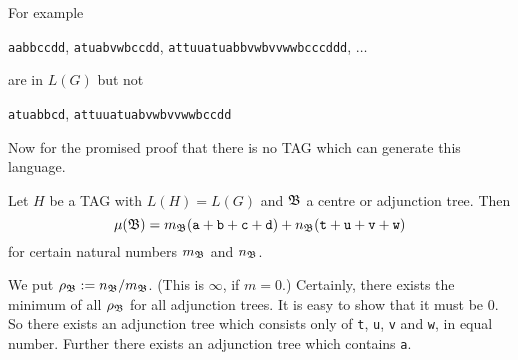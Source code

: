 For example
\begin{center}
{\tt aabbccdd}, {\tt atuabvwbccdd}, {\tt attuuatuabbvwbvvwwbcccddd},
$\dotsc$
\end{center}
are in $L(G)$ but not
\begin{center}
{\tt atuabbcd}, {\tt attuuatuabvwbvvwwbccdd}
\end{center}
Now for the promised proof that there is no TAG which can
generate this language. 
\begin{lem}
Let $H$ be a TAG with $L(H) = L(G)$ and $\mathfrak{B}$ a centre or
adjunction tree. Then
\begin{equation}
\mu(\mathfrak{B}) = m_{\mathfrak{B}}(\mbox{\tt a} + \mbox{\tt b} + \mbox{\tt c}
    + \mbox{\tt d}) + n_{\mathfrak{B}}(\mbox{\tt t} + \mbox{\tt u} +
        \mbox{\tt v} + \mbox{\tt w})
\end{equation}
for certain natural numbers $m_{\mathfrak{B}}$ and $n_{\mathfrak{B}}$.
\end{lem}
We put $\rho_{\mathfrak{B}} := n_{\mathfrak{B}}/m_{\mathfrak{B}}$. (This is $\infty$,
if $m = 0$.) Certainly, there exists the minimum of all
$\rho_{\mathfrak{B}}$ for all adjunction trees. It is easy to show that
it must be $0$. So there exists an adjunction tree
which consists only of {\tt t}, {\tt u}, {\tt v} and {\tt w},
in equal number. Further  there exists an adjunction tree
which contains {\tt a}.

